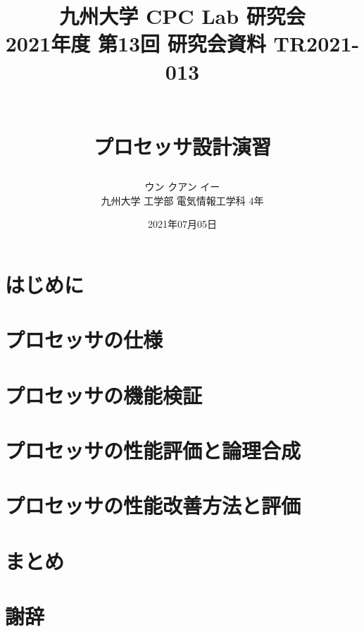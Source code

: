 \documentclass[a4paper, 10pt]{jarticle}
\title{
  \begin{flushright}
    \normalsize{
      九州大学 CPC Lab 研究会  \\
      2021年度 第13回 研究会資料 TR2021-013
    }
  \end{flushright}
  \Large{\textbf{\\プロセッサ設計演習}}
}
\author{
    ウン クアン イー\\
    九州大学 工学部 電気情報工学科 4年
}
\date{2021年07月05日}
\begin{document}
  \begin{twocolumn}

  \maketitle

  \section{はじめに} \label{section:introduction}
  

  \section{プロセッサの仕様} \label{section:specifications}
  

  \section{プロセッサの機能検証} \label{section:testing}
  

  \section{プロセッサの性能評価と論理合成} \label{section:evaluation}
  

  \section{プロセッサの性能改善方法と評価} \label{section:improvements}
  

  \section{まとめ} \label{section:summary}
  

  \section*{謝辞}
  

  
  

  \onecolumn
  \clearpage
  \begin{appendices} \label{section:appendix}

\end{appendices}
\end{twocolumn}
\end{document}

